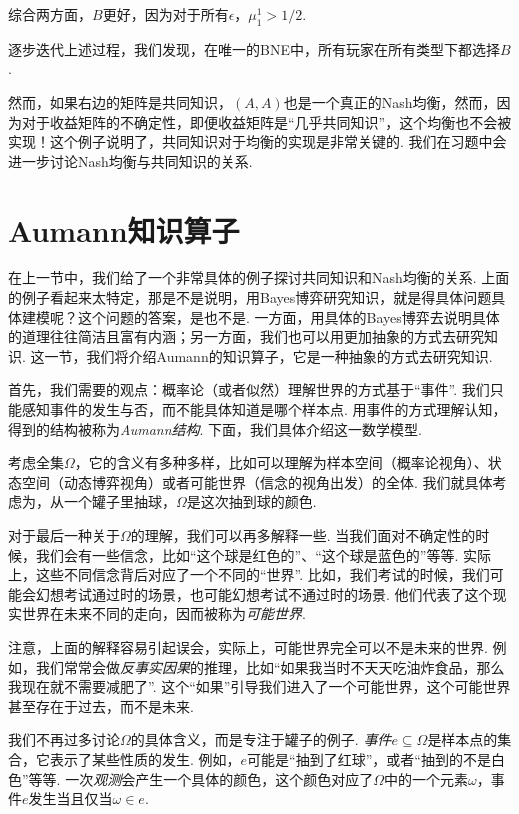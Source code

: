 综合两方面，$B$更好，因为对于所有$\epsilon$，$\mu_1^1 > 1/2$. 

逐步迭代上述过程，我们发现，在唯一的BNE中，所有玩家在所有类型下都选择$B$. 

然而，如果右边的矩阵是共同知识，$(A,A)$也是一个真正的Nash均衡，然而，因为对于收益矩阵的不确定性，即便收益矩阵是“几乎共同知识”，这个均衡也不会被实现！这个例子说明了，共同知识对于均衡的实现是非常关键的. 我们在习题中会进一步讨论Nash均衡与共同知识的关系.

\section{Aumann知识算子}

在上一节中，我们给了一个非常具体的例子探讨共同知识和Nash均衡的关系. 上面的例子看起来太特定，那是不是说明，用Bayes博弈研究知识，就是得具体问题具体建模呢？这个问题的答案，是也不是. 一方面，用具体的Bayes博弈去说明具体的道理往往简洁且富有内涵；另一方面，我们也可以用更加抽象的方式去研究知识. 这一节，我们将介绍Aumann的知识算子，它是一种抽象的方式去研究知识.

首先，我们需要的观点：概率论（或者似然）理解世界的方式基于“事件”. 我们只能感知事件的发生与否，而不能具体知道是哪个样本点. 用事件的方式理解认知，得到的结构被称为\emph{Aumann结构}. 下面，我们具体介绍这一数学模型. 

考虑全集$\Omega$，它的含义有多种多样，比如可以理解为样本空间（概率论视角）、状态空间（动态博弈视角）或者可能世界（信念的视角出发）的全体. 我们就具体考虑为，从一个罐子里抽球，$\Omega$是这次抽到球的颜色. 

对于最后一种关于$\Omega$的理解，我们可以再多解释一些. 当我们面对不确定性的时候，我们会有一些信念，比如“这个球是红色的”、“这个球是蓝色的”等等. 实际上，这些不同信念背后对应了一个不同的“世界”. 比如，我们考试的时候，我们可能会幻想考试通过时的场景，也可能幻想考试不通过时的场景. 他们代表了这个现实世界在未来不同的走向，因而被称为\emph{可能世界}.

注意，上面的解释容易引起误会，实际上，可能世界完全可以不是未来的世界. 例如，我们常常会做\emph{反事实因果}的推理，比如“如果我当时不天天吃油炸食品，那么我现在就不需要减肥了”. 这个“如果”引导我们进入了一个可能世界，这个可能世界甚至存在于过去，而不是未来.

我们不再过多讨论$\Omega$的具体含义，而是专注于罐子的例子. \emph{事件}$e\subseteq \Omega$是样本点的集合，它表示了某些性质的发生. 例如，$e$可能是“抽到了红球”，或者“抽到的不是白色”等等. 一次\emph{观测}会产生一个具体的颜色，这个颜色对应了$\Omega$中的一个元素$\omega$，事件$e$发生当且仅当$\omega\in e$.

